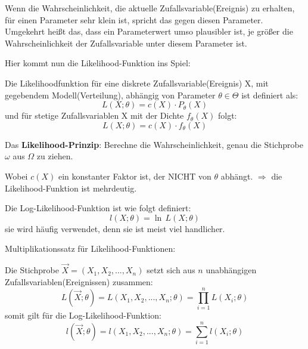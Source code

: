 Wenn die Wahrscheinlichkeit, die aktuelle Zufallsvariable(Ereignis) zu erhalten,
für einen Parameter sehr klein ist, spricht das gegen diesen Parameter.
Umgekehrt heißt das, dass ein Parameterwert umso plausibler ist, je größer
die Wahrscheinlichkeit der Zufallsvariable unter diesem Parameter ist. 

Hier kommt nun die Likelihood-Funktion ins Spiel:
\begin{definition}Die Likelihoodfunktion für eine diskrete Zufallsvariable(Ereignis) X, mit gegebendem Modell(Verteilung), abhängig von Parameter $\theta\in\Theta$ ist definiert als:\label{def:likelihoodfunktion}
\[L(X;\theta)=c(X)\cdot P_\theta(X)\]
und für stetige Zufallsvariablen X mit der Dichte $f_\theta(X)$ folgt:
\[L(X;\theta)=c(X)\cdot f_\theta(X)\]
\end{definition}
Das \textbf{Likelihood-Prinzip}: Berechne die Wahrscheinlichkeit, genau die Stichprobe $\omega$ aus $\Omega$ zu ziehen.

Wobei $c(X)$ ein konstanter Faktor ist, der NICHT von $\theta$ abhängt. $\Rightarrow$ die Likelihood-Funktion ist mehrdeutig.

\begin{definition}
Die Log-Likelihood-Funktion ist wie folgt definiert:
\[l(X;\theta)=\ln\,L(X;\theta)\]
sie wird häufig verwendet, denn sie ist meist viel handlicher.
\end{definition}

\begin{definition}Multiplikationssatz für Likelihood-Funktionen:\label{def:multiplikationssatz_likelihood}

Die Stichprobe $\vec X=(X_1, X_2, ..., X_n)$ setzt sich aus $n$ unabhängigen Zufallsvariablen(Ereignissen) zusammen:
    \[L(\vec X;\theta) = L(X_1, X_2, ..., X_n;\theta) = \prod_{i=1}^nL(X_i;\theta)\]
somit gilt für die Log-Likelihood-Funktion:
    \[l(\vec X;\theta) = l(X_1, X_2, ..., X_n;\theta) = \sum_{i=1}^nl(X_i;\theta)\]
\end{definition}

